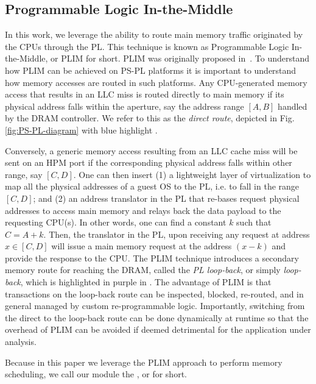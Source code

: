 \subsection{Programmable Logic In-the-Middle}
In this work, we leverage the ability to route main memory traffic
originated by the CPUs through the PL. This technique is known as
Programmable Logic In-the-Middle, or PLIM for short. PLIM was
originally proposed in~\cite{PLIM20}. To understand how PLIM can be
achieved on PS-PL platforms it is important to understand how memory
accesses are routed in such platforms. Any CPU-generated memory access
that results in an LLC miss is routed directly to main memory if its
physical address falls within the aperture, say the address range
$[A,B]$ handled by the DRAM controller. We refer to this as the
\emph{direct route}, depicted in Fig. \ref{fig:PS-PL-diagram} with
blue highlight .

Conversely, a generic memory access resulting from an LLC cache miss
will be sent on an HPM port if the corresponding physical address
falls within other range, say $[C,D]$. One can then insert (1) a
lightweight layer of virtualization to map all the physical addresses
of a guest OS to the PL, i.e. to fall in the range $[C,D]$; and (2) an
address translator in the PL that re-bases request physical addresses
to access main memory and relays back the data payload to the
requesting CPU(s). In other words, one can find a constant $k$ such
that $C = A + k$. Then, the translator in the PL, upon receiving any
request at address $x \in [C, D]$ will issue a main memory request at
the address $(x - k)$ and provide the response to the CPU.  The PLIM
technique introduces a secondary memory route for reaching the DRAM,
called the \emph{PL loop-back}, or simply \emph{loop-back}, which is
highlighted in purple in . The
advantage of PLIM is that transactions on the loop-back route can be
inspected, blocked, re-routed, and in general managed by custom
re-programmable logic. Importantly, switching from the direct to the
loop-back route can be done dynamically at runtime so that the
overhead of PLIM can be avoided if deemed detrimental for the
application under analysis.

Because in this paper we leverage the PLIM approach to perform memory
scheduling, we call our module the \schimL, or \schim for short.


